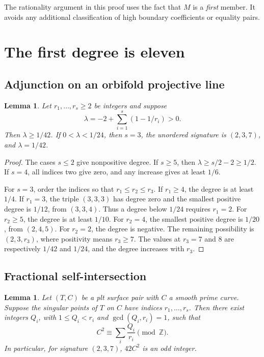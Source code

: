 \documentclass[12pt,a4paper]{article}
\numberwithin{equation}{section}
\newtheorem{lemma}[theorem]{Lemma}
\theoremstyle{definition}
\newcommand{\Z}{\mathbb Z}
\begin{document}
The rationality argument in this proof uses the fact that \(M\)
is a \emph{first} member. It avoids any additional classification of
high boundary coefficients or equality pairs.

\section{The first degree is eleven}\label{sec:eleven}

\subsection{Adjunction on an orbifold projective line}

\begin{lemma}\label{lem:orbifold-line}
Let \(r_1,\ldots,r_s\geq2\) be integers and suppose
\[
                    \lambda=-2+\sum_{i=1}^s(1-1/r_i)>0.
\]
Then \(\lambda\geq1/42\).
If \(0<\lambda<1/24\), then \(s=3\), the unordered signature is
\((2,3,7)\), and \(\lambda=1/42\).
\end{lemma}

\begin{proof}
The cases \(s\leq2\) give nonpositive degree.
If \(s\geq5\), then \(\lambda\geq s/2-2\geq1/2\).
If \(s=4\), all indices two give zero, and any increase gives at
least \(1/6\).

For \(s=3\), order the indices so that
\(r_1\leq r_2\leq r_3\).
If \(r_1\geq4\), the degree is at least \(1/4\).
If \(r_1=3\), the triple \((3,3,3)\) has degree zero and the
smallest positive degree is \(1/12\), from \((3,3,4)\).
Thus a degree below \(1/24\) requires \(r_1=2\).
For \(r_2\geq5\), the degree is at least \(1/10\).
For \(r_2=4\), the smallest positive degree is \(1/20\),
from \((2,4,5)\).
For \(r_2=2\), the degree is negative.
The remaining possibility is \((2,3,r_3)\), where positivity means
\(r_3\geq7\). The values at \(r_3=7\) and \(8\) are respectively
\(1/42\) and \(1/24\), and the degree increases with \(r_3\).
\end{proof}

\subsection{Fractional self-intersection}

\begin{lemma}\label{lem:intersection-congruence}
Let \((T,C)\) be a plt surface pair with \(C\) a smooth prime curve.
Suppose the singular points of \(T\) on \(C\) have indices
\(r_1,\ldots,r_s\).
Then there exist integers \(Q_i\), with
\(1\leq Q_i<r_i\) and \(\gcd(Q_i,r_i)=1\), such that
\begin{equation}\label{eq:local-intersection}
                         C^2\equiv\sum_i\frac{Q_i}{r_i}\pmod{\Z}.
\end{equation}
In particular, for signature \((2,3,7)\), \(42C^2\) is an odd integer.
\end{lemma}
\end{document}

